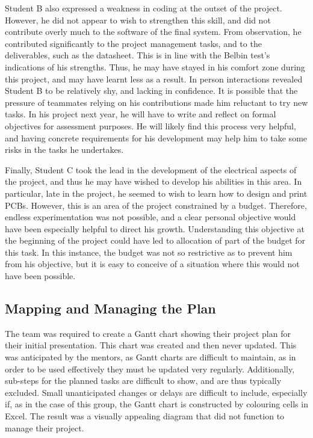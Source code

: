         Student B also expressed a weakness in coding at the outset of the project.
        However, he did not appear to wish to strengthen this skill, and did not contribute overly much to the software of the final system.
        From observation, he contributed significantly to the project management tasks, and to the deliverables, such as the datasheet.
        This is in line with the Belbin test's indications of his strengths.
        Thus, he may have stayed in his comfort zone during this project, and may have learnt less as a result.
        In person interactions revealed Student B to be relatively shy, and lacking in confidence.
        It is possible that the pressure of teammates relying on his contributions made him reluctant to try new tasks.
        In his project next year, he will have to write and reflect on formal objectives for assessment purposes.
        He will likely find this process very helpful, and having concrete requirements for his development may help him to take some risks in the tasks he undertakes.

        Finally, Student C took the lead in the development of the electrical aspects of the project, and thus he may have wished to develop his abilities in this area.
        In particular, late in the project, he seemed to wish to learn how to design and print PCBs.
        However, this is an area of the project constrained by a budget.
        Therefore, endless experimentation was not possible, and a clear personal objective would have been especially helpful to direct his growth.
        Understanding this objective at the beginning of the project could have led to allocation of part of the budget for this task.
        In this instance, the budget was not so restrictive as to prevent him from his objective, but it is easy to conceive of a situation where this would not have been possible.

    \subsection{Mapping and Managing the Plan}\label{subsec:managemement-plan}
        The team was required to create a Gantt chart showing their project plan for their initial presentation.
        This chart was created and then never updated.
        This was anticipated by the mentors, as Gantt charts are difficult to maintain, as in order to be used effectively they must be updated very regularly.
        Additionally, sub-steps for the planned tasks are difficult to show, and are thus typically excluded.
        Small unanticipated changes or delays are difficult to include, especially if, as in the case of this group, the Gantt chart is constructed by colouring cells in Excel.
        The result was a visually appealing diagram that did not function to manage their project.

